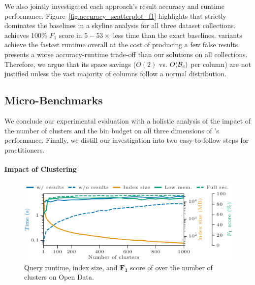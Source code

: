 We also jointly investigated each approach's result accuracy and runtime performance.
Figure~\ref{fig:accuracy_scatterplot_f1} highlights that \system{} strictly dominates the baselines in a skyline analysis for all three dataset collections.
\exact{} achieves 100\% $F_1$ score in $5-53\times$ less time than the exact baselines.
\approximate{} variants achieve the fastest runtime overall at the cost of producing a few false results.
\ndist presents a worse accuracy-runtime trade-off than our solutions on all collections.
Therefore, we argue that its space savings ($O(2)$ vs. $O(\mathcal{B}_c)$ per column) are not justified unless the vast majority of columns follow a normal distribution.


\subsection{Micro-Benchmarks}
\label{sec:micro_benchmarks}

We conclude our experimental evaluation with a holistic analysis of the impact of the number of clusters and the bin budget on all three dimensions of \system{}'s performance.
Finally, we distill our investigation into two easy-to-follow steps for practitioners.

\paragraph{Impact of Clustering}

\begin{figure}[t]
    \centering
    \includegraphics[scale=0.965]{figures/figure_19.pdf}
    \caption{Query runtime, index size, and $\boldsymbol{F_1}$ score of \approximate{} over the number of clusters on Open Data.}
    \label{fig:microbenchmark_open_data_k}
\end{figure}

